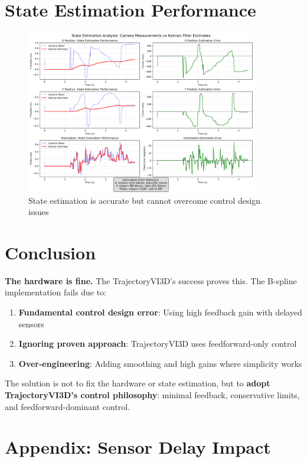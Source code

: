 \documentclass[12pt,a4paper]{article}
\begin{document}
\section{State Estimation Performance}

\begin{figure}[H]
\centering
\includegraphics[width=0.9\textwidth]{state_estimation_analysis.png}
\caption{State estimation is accurate but cannot overcome control design issues}
\end{figure}

\section{Conclusion}

\textbf{The hardware is fine.} The TrajectoryVI3D's success proves this. The B-spline implementation fails due to:
\begin{enumerate}
    \item \textbf{Fundamental control design error}: Using high feedback gain with delayed sensors
    \item \textbf{Ignoring proven approach}: TrajectoryVI3D uses feedforward-only control
    \item \textbf{Over-engineering}: Adding smoothing and high gains where simplicity works
\end{enumerate}

The solution is not to fix the hardware or state estimation, but to \textbf{adopt TrajectoryVI3D's control philosophy}: minimal feedback, conservative limits, and feedforward-dominant control.

\section{Appendix: Sensor Delay Impact}
\end{document}
